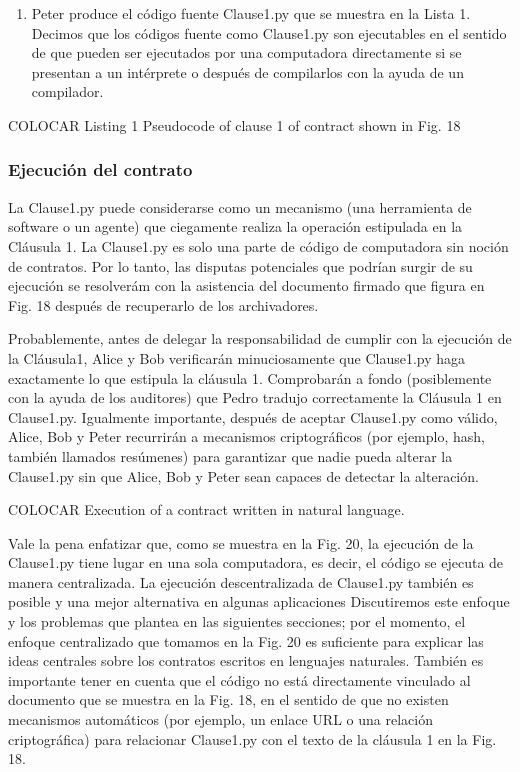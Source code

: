 \documentclass[12pt]{report} %
\begin{document}
\begin{itemize}
\begin{enumerate}
    \item Peter produce el código fuente Clause1.py que se muestra en la Lista 1. Decimos que los códigos fuente como Clause1.py son ejecutables en el sentido de que pueden ser ejecutados por una computadora directamente si se presentan a un intérprete o después de compilarlos con la ayuda de un compilador.

   
\end{enumerate}

COLOCAR Listing 1 Pseudocode of clause 1 of contract shown in Fig. 18

\subsubsection{Ejecución del contrato}

La Clause1.py puede considerarse como un mecanismo (una herramienta de software o un agente) que ciegamente realiza la operación estipulada en la Cláusula 1. La Clause1.py es solo una parte de código de computadora sin noción de contratos. Por lo tanto, las disputas potenciales que podrían surgir de su ejecución se resolverám con la asistencia del documento firmado que figura en Fig. 18 después de recuperarlo de los archivadores.

Probablemente, antes de delegar la responsabilidad de cumplir con la ejecución de la Cláusula1, Alice y Bob verificarán minuciosamente que Clause1.py haga exactamente lo que estipula la cláusula 1. Comprobarán a fondo (posiblemente con la ayuda de los auditores) que Pedro tradujo correctamente la Cláusula 1 en Clause1.py. Igualmente importante, después de aceptar Clause1.py como válido, Alice, Bob y Peter recurrirán a mecanismos criptográficos (por ejemplo, hash, también llamados resúmenes) para garantizar que nadie pueda alterar la Clause1.py sin que Alice, Bob y Peter sean capaces de detectar la alteración.

COLOCAR Execution of a contract written in natural language.

Vale la pena enfatizar que, como se muestra en la Fig. 20, la ejecución de la Clause1.py tiene lugar en una sola computadora, es decir, el código se ejecuta de manera centralizada. La ejecución descentralizada de Clause1.py también es posible y una mejor alternativa en algunas aplicaciones Discutiremos este enfoque y los problemas que plantea en las siguientes secciones; por el momento, el enfoque centralizado que tomamos en la Fig. 20 es suficiente para explicar las ideas centrales sobre los contratos escritos en lenguajes naturales. También es importante tener en cuenta que el código no está directamente vinculado al documento que se muestra en la Fig. 18, en el sentido de que no existen mecanismos automáticos (por ejemplo, un enlace URL o una relación criptográfica) para relacionar Clause1.py con el texto de la cláusula 1 en la Fig. 18.


\end{itemize}
\end{document}
